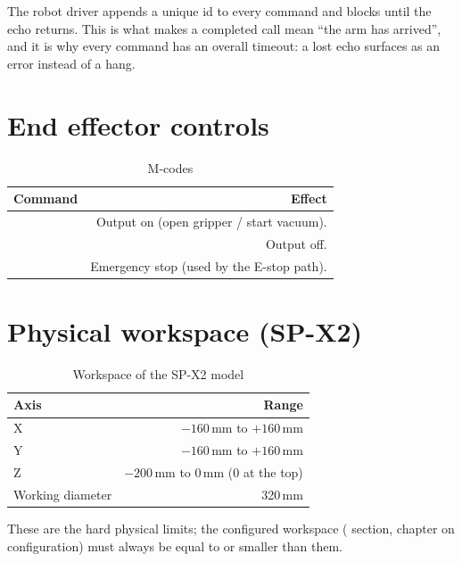 \begin{notebox}
  The robot driver appends a unique  id to every
  command and blocks until the echo returns. This is what makes a
  completed  call mean ``the arm has arrived'', and it is
  why every command has an overall timeout: a lost echo surfaces as an
  error instead of a hang.
\end{notebox}

\section{End effector controls}
%
\begin{table}[h]
  \centering
  \begin{tabularx}{\textwidth}{lD}
    \toprule
    \textbf{Command} & \textbf{Effect} \\
    \midrule
     & Output on (open gripper / start vacuum). \\
     & Output off. \\
     & Emergency stop (used by the E-stop path). \\
    \bottomrule
  \end{tabularx}
  \caption{M-codes}
\end{table}

\section{Physical workspace (SP-X2)}
%
\begin{table}[h]
  \centering
  \begin{tabularx}{\textwidth}{lD}
    \toprule
    \textbf{Axis} & \textbf{Range} \\
    \midrule
    X & $-160$\,mm to $+160$\,mm \\
    Y & $-160$\,mm to $+160$\,mm \\
    Z & $-200$\,mm to $0$\,mm ($0$ at the top) \\
    Working diameter & 320\,mm \\
    \bottomrule
  \end{tabularx}
  \caption{Workspace of the SP-X2 model}
\end{table}

These are the hard physical limits; the configured workspace
(\cfg{[robot]} section, chapter on configuration) must always be equal to
or smaller than them.


